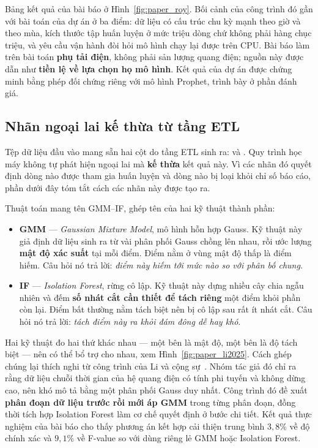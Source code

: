 \documentclass[12pt,a4paper]{article}
\DeclareRobustCommand{\tep}[1]{\texttt{\detokenize{#1}}}
\begin{document}
Bảng kết quả của bài báo ở Hình~\ref{fig:paper_roy}.
Bối cảnh của công trình đó gần với bài toán của dự án ở ba điểm: dữ liệu có cấu trúc
chu kỳ mạnh theo giờ và theo mùa, kích thước tập huấn luyện ở mức triệu dòng chứ không
phải hàng chục triệu, và yêu cầu vận hành đòi hỏi mô hình chạy lại được trên CPU. Bài báo
làm trên bài toán \textbf{phụ tải điện}, không phải sản lượng quang điện; nguồn này được dẫn
như \textbf{tiền lệ về lựa chọn họ mô hình}. Kết quả của dự án được
chứng minh bằng phép đối chứng riêng với mô hình Prophet, trình bày ở phần đánh giá.

\subsection{Nhãn ngoại lai kế thừa từ tầng ETL}

Tệp dữ liệu đầu vào mang sẵn hai cột do tầng ETL sinh ra:
\tep{gmm_if_outlier_flag} và \tep{gmm_if_outlier_reason}. Quy trình học máy không tự
phát hiện ngoại lai mà \textbf{kế thừa} kết quả này. Vì các nhãn đó quyết định dòng
nào được tham gia huấn luyện và dòng nào bị loại khỏi chỉ số báo cáo, phần dưới đây tóm
tắt cách các nhãn này được tạo ra.

Thuật toán mang tên GMM--IF, ghép tên của hai kỹ thuật thành phần:

\begin{itemize}
    \item \textbf{GMM} --- \textit{Gaussian Mixture Model}, mô hình hỗn hợp Gauss. Kỹ thuật
    này giả định dữ liệu sinh ra từ vài phân phối Gauss chồng lên nhau, rồi ước lượng
    \textbf{mật độ xác suất} tại mỗi điểm. Điểm nằm ở vùng mật độ thấp là điểm hiếm. Câu hỏi
    nó trả lời: \textit{điểm này hiếm tới mức nào so với phân bố chung}.
    \item \textbf{IF} --- \textit{Isolation Forest}, rừng cô lập. Kỹ thuật này dựng nhiều cây
    chia ngẫu nhiên và đếm \textbf{số nhát cắt cần thiết để tách riêng} một điểm khỏi phần
    còn lại. Điểm bất thường nằm tách biệt nên bị cô lập sau rất ít nhát cắt. Câu hỏi nó trả
    lời: \textit{tách điểm này ra khỏi đám đông dễ hay khó}.
\end{itemize}

Hai kỹ thuật đo hai thứ khác nhau --- một bên là mật độ, một bên là độ tách biệt --- nên có
thể bổ trợ cho nhau, xem Hình~\ref{fig:paper_li2025}.
Cách ghép chúng lại thích nghi từ công trình của Li và cộng
sự~\cite{li2025gmmif}. Nhóm tác giả đó chỉ ra rằng dữ liệu chuỗi thời gian của hệ quang điện
có tính phi tuyến và không dừng cao, nên khó mô tả bằng một phân phối Gauss duy nhất. Công
trình đó đề xuất \textbf{phân đoạn dữ liệu trước rồi mới áp GMM} trong từng phân đoạn, đồng
thời tích hợp Isolation Forest làm cơ chế quyết định ở bước chi tiết. Kết quả thực nghiệm
của bài báo cho thấy phương án kết hợp cải thiện trung bình $3{,}8\%$ về độ chính xác và
$9{,}1\%$ về F-value so với dùng riêng lẻ GMM hoặc Isolation Forest.
\end{document}

